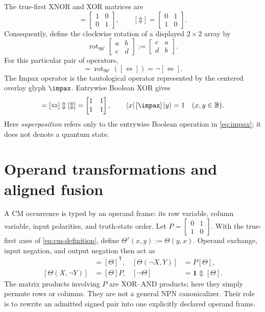 \documentclass[11pt]{article}
\newcommand{\Bool}{\mathbb{B}}
\newcommand{\XOR}{\mathbin{\Updownarrow}}
\newcommand{\CM}[1]{[#1]}
\newcommand{\stateket}[1]{\left|#1\right\rangle}
\newcommand{\statebra}[1]{\left\langle#1\right|}
\DeclareMathOperator{\rot}{rot}
\begin{document}
The true-first XNOR and XOR matrices are
\begin{equation}
  \CM{\Leftrightarrow}=\begin{bmatrix}1&0\\0&1\end{bmatrix},
  \qquad
  \CM{\XOR}=\begin{bmatrix}0&1\\1&0\end{bmatrix}.
\end{equation}
Consequently,
define the clockwise rotation of a displayed $2\times2$ array by
\[
  \rot_{90^\circ}\!\begin{bmatrix}a&b\\c&d\end{bmatrix}
  :=\begin{bmatrix}c&a\\d&b\end{bmatrix}.
\]
For this particular pair of operators,
\begin{equation}
  \CM{\XOR}
  =\rot_{90^\circ}\!\left(\CM{\Leftrightarrow}\right)
  =\neg\CM{\Leftrightarrow}.
  \label{eq:xor-xnor-rotation}
\end{equation}
The Impax operator is the tautological operator represented by the centered
overlay glyph $\impax$. Entrywise Boolean XOR gives
\begin{equation}
  \CM{\impax}
  =\CM{\Leftrightarrow}\XOR\CM{\XOR}
  =\begin{bmatrix}1&1\\1&1\end{bmatrix},
  \qquad
  \statebra{x}\CM{\impax}\stateket{y}=1
  \quad(x,y\in\Bool).
  \label{eq:impax}
\end{equation}
Here \emph{superposition} refers only to the entrywise Boolean operation in
\eqref{eq:impax}; it does not denote a quantum state.

\section{Operand transformations and aligned fusion}
\label{sec:alignment-fusion}

A CM occurrence is typed by an operand frame: its row variable, column
variable, input polarities, and truth-state order. Let
$P=\begin{bmatrix}0&1\\1&0\end{bmatrix}$. With the true-first axes of
\eqref{eq:cm-definition}, define $\Theta^\tau(x,y):=\Theta(y,x)$. Operand
exchange, input negation, and output negation then act as
\begin{align}
  \CM{\Theta^\tau} &= \CM{\Theta}^{\mathsf T}, &
  \CM{\Theta(\neg X,Y)} &= P\CM{\Theta},\\
  \CM{\Theta(X,\neg Y)} &= \CM{\Theta}P, &
  \CM{\neg\Theta} &= \mathbf{1}\XOR\CM{\Theta}.
  \label{eq:frame-transformations}
\end{align}
The matrix products involving $P$ are XOR--AND products; here they simply
permute rows or columns. They are not a general NPN canonicalizer. Their role
is to rewrite an admitted signed pair into one explicitly declared operand
frame.
\end{document}

